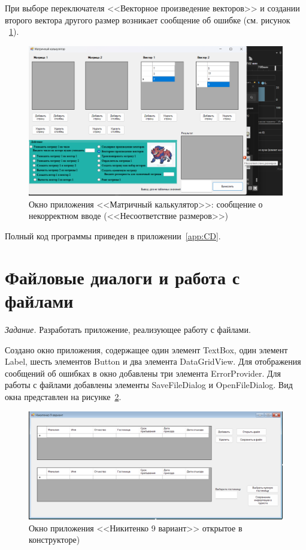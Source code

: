 \documentclass[bachelor, och, pract, times]{SCWorks}
\begin{document}
При выборе переключателя <<Векторное произведение векторов>> и создании второго вектора другого размер возникает сообщение об ошибке (см. рисунок ~\ref{fig:matrix-09}).

\begin{figure}[H]
    \centering
    \includegraphics[scale=0.4]{Скрины/Снимок экрана 2025-01-05 134125.png}
    \caption{Окно приложения <<Матричный калькулятор>>: сообщение о некорректном вводе (<<Несоответствие размеров>>)}\label{fig:matrix-09}
\end{figure}


Полный код программы приведен в приложении~\ref{app:CD}.

\section{Файловые диалоги и работа с файлами}

\textsl{Задание.} Разработать приложение, реализующее работу с файлами.

Создано окно приложения, содержащее один элемент TextBox, один элемент Label, шесть элементов Button и два элемента DataGridView. Для отображения сообщений об ошибках в окно добавлены три элемента ErrorProvider. Для работы с файлами добавлены элементы SaveFileDialog\cite{search_7,bookc++tat} и OpenFileDialog\cite{search_8}. Вид окна представлен на рисунке~\ref{fig:file-01}.

\begin{figure}[H]
    \centering
    \includegraphics[scale=0.45]{Скрины/Снимок экрана 2025-01-05 134825.png}
    \caption{Окно приложения <<Никитенко 9 вариант>> открытое в конструкторе)}\label{fig:file-01}
\end{figure}
\end{document}
